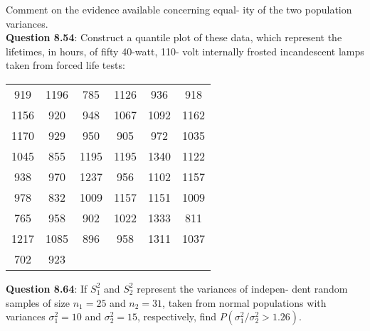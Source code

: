 \documentclass{article}
\begin{document}
    Comment on the evidence available concerning equal-
    ity of the two population variances.\\\newline
    \textbf{Question 8.54}: Construct a quantile plot of these data, which
    represent the lifetimes, in hours, of fifty 40-watt, 110-
    volt internally frosted incandescent lamps taken from
    forced life tests:
        \begin{center}
            \begin{tabular}{c c c c c c}
                919 & 1196 & 785 & 1126 & 936 & 918 \\
                1156 & 920 & 948 & 1067 & 1092 & 1162 \\
                1170 & 929 & 950 & 905 & 972 & 1035 \\
                1045 & 855 & 1195 & 1195 & 1340 & 1122 \\
                938 & 970 & 1237 & 956  & 1102 & 1157 \\
                978 & 832 & 1009 & 1157 & 1151 & 1009 \\
                765 & 958 & 902 & 1022 & 1333 & 811 \\ 
                1217 & 1085 & 896 & 958 & 1311 & 1037 \\
                702 & 923
            \end{tabular}
        \end{center}
    \textbf{Question 8.64}: If $S^2_1$ and $S_2^2$ represent the variances of indepen-
    dent random samples of size $n_1 = 25$ and $n_2 = 31$,
    taken from normal populations with variances $\sigma^2_1 = 10$
    and $\sigma_2^2 = 15$, respectively, find $P(\sigma^2_1 / \sigma_2^2 > 1.26)$.
\end{document}
